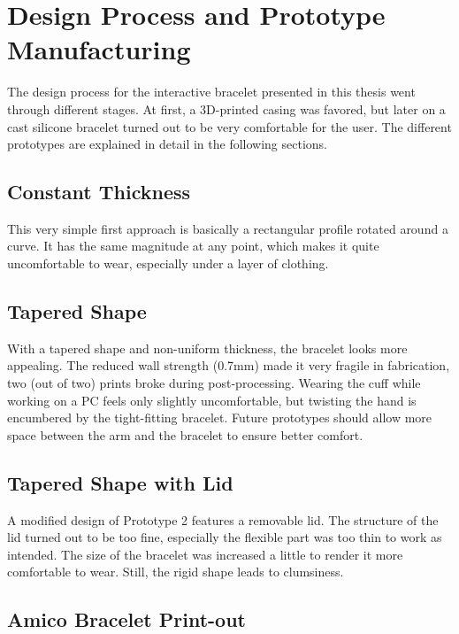 \section{Design Process and Prototype Manufacturing}

The design process for the interactive bracelet presented in this thesis went through different stages. At first, a 3D-printed casing was favored, but later on a cast silicone bracelet turned out to be very comfortable for the user. The different prototypes are explained in detail in the following sections.

\subsection{Constant Thickness}

This very simple first approach is basically a rectangular profile rotated around a curve. It has the same magnitude at any point, which makes it quite uncomfortable to wear, especially under a layer of clothing.

\subsection{Tapered Shape}

With a tapered shape and non-uniform thickness, the bracelet looks more appealing. The reduced wall strength (0.7mm) made it very fragile in fabrication, two (out of two) prints broke during post-processing. Wearing the cuff while working on a PC feels only slightly uncomfortable, but twisting the hand is encumbered by the tight-fitting bracelet. Future prototypes should allow more space between the arm and the bracelet to ensure better comfort.

\subsection{Tapered Shape with Lid}

A modified design of Prototype 2 features a removable lid. The structure of the lid turned out to be too fine, especially the flexible part was too thin to work as intended. The size of the bracelet was increased a little to render it more comfortable to wear. Still, the rigid shape leads to clumsiness.

\subsection{Amico Bracelet Print-out}

